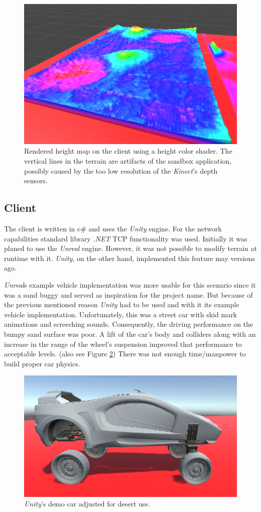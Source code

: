 \documentclass[12pt,a4paper,twoside,titlepage,headsepline,numbers=noenddot,listof=totoc,index=totoc,bibliography=totoc]{scrartcl}
\theoremstyle{break}
\begin{document}
\begin{figure}
	\centering
	\includegraphics[width=0.8\linewidth]{figures/sandboxHeightShade}
	\caption{Rendered height map on the client using a height color shader. The vertical lines in the terrain are artifacts of the sandbox application, possibly caused by the too low resolution of the \textit{Kinect}'s depth sensors.}
	\label{fig:sandboxheightshade}
\end{figure}

\subsection{Client}
The client is written in c\# and uses the \textit{Unity} engine. For the network capabilities standard library \textit{.NET} TCP functionality was used. Initially it was planed to use the \textit{Unreal} engine. However, it was not possible to modify terrain at runtime with it. \textit{Unity}, on the other hand, implemented this feature may versions ago. 

\textit{Unreal}s example vehicle implementation was more usable for this scenario since it was a sand buggy and served as inspiration for the project name. But because of the previous mentioned reason \textit{Unity} had to be used and with it its example vehicle implementation. Unfortunately, this was a street car with skid mark animations and screeching sounds. Consequently, the driving performance on the bumpy sand surface was poor. A lift of the car's body and colliders along with an increase in the range of the wheel's suspension improved that performance to acceptable levels. (also see Figure \ref{fig:streetcarbuggy}) There was not enough time/manpower to build proper car physics.   

\begin{figure}
	\centering
	\includegraphics[width=0.7\linewidth]{figures/streetcarbuggy}
	\caption{\textit{Unity}'s demo car adjusted for desert use.}
	\label{fig:streetcarbuggy}
\end{figure}
\end{document}
